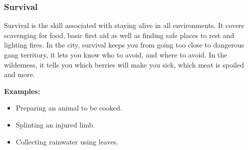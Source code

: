 \subsubsection{Survival} \label{subsubsec:survival}

Survival is the skill associated with staying alive in all environments. It covers scavenging for food, basic first aid as well as finding safe places to rest and lighting fires. In the city, survival keeps you from going too close to dangerous gang territory, it lets you know who to avoid, and where to avoid. In the wilderness, it tells you which berries will make you sick, which meat is spoiled and more.

\begin{displayquote}
    \textbf{Examples:}
    \begin{itemize}
        \item Preparing an animal to be cooked.
        \item Splinting an injured limb.
        \item Collecting rainwater using leaves.
    \end{itemize}
\end{displayquote}